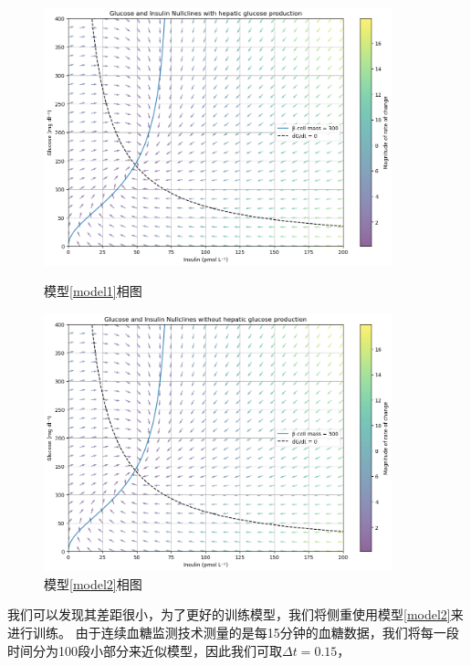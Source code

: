 \begin{figure}[H]
    \begin{minipage}[t]{0.5\textwidth}
        \centering
        \includegraphics[width=0.9\textwidth]{Img/phase_300.png}
        \caption{模型\ref{model1}相图}
    \end{minipage}
    \begin{minipage}[t]{0.5\textwidth}
        \centering
        \includegraphics[width=0.9\textwidth]{Img/phase_hepatic.png}
        \caption{模型\ref{model2}相图}
    \end{minipage}
\end{figure}
我们可以发现其差距很小，为了更好的训练模型，我们将侧重使用模型\ref{model2}来进行训练。
由于连续血糖监测技术测量的是每15分钟的血糖数据，我们将每一段时间分为100段小部分来近似模型，因此我们可取$\Delta t = 0.15$，

    
